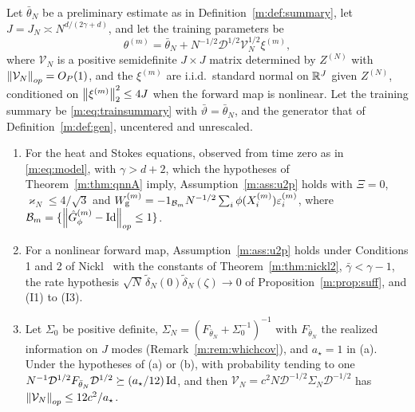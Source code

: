 \begin{theorem}\label{m:thm:u2ploc}
Let $\bar\theta_N$ be a preliminary estimate as in Definition~\ref{m:def:summary}, let $J=J_N\asymp N^{d/(2\gamma+d)}$, and let the training parameters be
\[
\theta^{(m)}=\bar\theta_N+N^{-1/2}\mathcal D^{1/2}\mathcal V_N^{1/2}\xi^{(m)},
\]
where $\mathcal V_N$ is a positive semidefinite $J\times J$ matrix determined by $Z^{(N)}$ with $\left\|\mathcal V_N\right\|_{op}=O_P(1)$, and the $\xi^{(m)}$ are i.i.d.\ standard normal on $\mathbb{R}^J$ given $Z^{(N)}$, conditioned on $\left\|\xi^{(m)}\right\|^2_2\le4J$ when the forward map is nonlinear. Let the training summary be \eqref{m:eq:trainsummary} with $\bar\vartheta=\bar\theta_N$, and the generator that of Definition~\ref{m:def:gen}, uncentered and unrescaled.
\begin{enumerate}[label=(\alph*),nosep]
\item For the heat and Stokes equations, observed from time zero as in \eqref{m:eq:model}, with $\gamma>d+2$, which the hypotheses of Theorem~\ref{m:thm:qnnA} imply, Assumption~\ref{m:ass:u2p} holds with $\Xi=0$, $\varkappa_N\le4/\sqrt3$ and $W^{(m)}_{\rm g}=-1_{\mathcal B_m}N^{-1/2}\sum_i\phi(X^{(m)}_i)\varepsilon^{(m)}_i$, where $\mathcal B_m=\{\left\|\hat G^{(m)}_\phi-\operatorname{Id}\right\|_{op}\le1\}$.
\item For a nonlinear forward map, Assumption~\ref{m:ass:u2p} holds under Conditions 1 and 2 of Nickl~\cite{nicklbvm2024} with the constants of Theorem~\ref{m:thm:nickl2}, $\bar\gamma<\gamma-1$, the rate hypothesis $\sqrt N\,\tilde\delta_N(0)\tilde\delta_N(\zeta)\to0$ of Proposition~\ref{m:prop:suff}, and (I1) to (I3).
\item Let $\Sigma_0$ be positive definite, $\Sigma_N=(F_{\bar\theta_N}+\Sigma_0^{-1})^{-1}$ with $F_{\bar\theta_N}$ the realized information on $J$ modes (Remark~\ref{m:rem:whichcov}), and $a_\star=1$ in (a). Under the hypotheses of (a) or (b), with probability tending to one $N^{-1}\mathcal D^{1/2}F_{\bar\theta_N}\mathcal D^{1/2}\succeq(a_\star/12)\operatorname{Id}$, and then $\mathcal V_N=c^2N\mathcal D^{-1/2}\Sigma_N\mathcal D^{-1/2}$ has $\left\|\mathcal V_N\right\|_{op}\le12c^2/a_\star$.
\end{enumerate}
\end{theorem}

